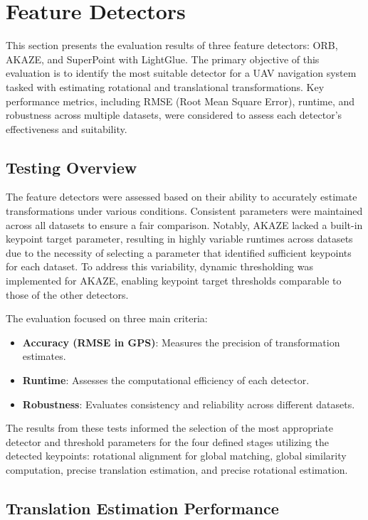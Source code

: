 \section{Feature Detectors}

This section presents the evaluation results of three feature detectors: ORB, AKAZE, and SuperPoint with LightGlue. The primary objective of this evaluation is to identify the most suitable detector for a UAV navigation system tasked with estimating rotational and translational transformations. Key performance metrics, including RMSE (Root Mean Square Error), runtime, and robustness across multiple datasets, were considered to assess each detector's effectiveness and suitability.

\subsection{Testing Overview}

The feature detectors were assessed based on their ability to accurately estimate transformations under various conditions. Consistent parameters were maintained across all datasets to ensure a fair comparison. Notably, AKAZE lacked a built-in keypoint target parameter, resulting in highly variable runtimes across datasets due to the necessity of selecting a parameter that identified sufficient keypoints for each dataset. To address this variability, dynamic thresholding was implemented for AKAZE, enabling keypoint target thresholds comparable to those of the other detectors.

The evaluation focused on three main criteria:
\begin{itemize}
    \item \textbf{Accuracy (RMSE in GPS)}: Measures the precision of transformation estimates.
    \item \textbf{Runtime}: Assesses the computational efficiency of each detector.
    \item \textbf{Robustness}: Evaluates consistency and reliability across different datasets.
\end{itemize}

The results from these tests informed the selection of the most appropriate detector and threshold parameters for the four defined stages utilizing the detected keypoints: rotational alignment for global matching, global similarity computation, precise translation estimation, and precise rotational estimation.

\subsection{Translation Estimation Performance}

